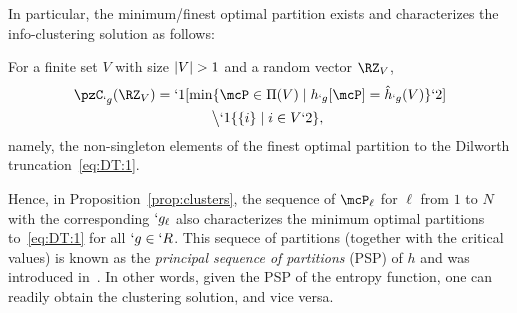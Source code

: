 In particular, the minimum/finest optimal partition exists and characterizes the info-clustering solution as follows:
\begin{Proposition}%
	\label{prop:psp}
	For a finite set $V$ with size $\lvert V\rvert>1$ and a random vector $\RZ_V$,
	\begin{align}
		\begin{split}
	\pzC_{`g}(\RZ_V)
	&=`1[\min \Set{\mcP\in \Pi(V) \mid h_{`g}[\mcP]=\hat{h}_{`g}(V)}`2]\\ &\kern4em \big\backslash`1\{\Set{i}\mid i\in V`2\}, 
	   \end{split}
	\end{align}
namely, the non-singleton elements of the finest optimal partition to the Dilworth truncation~\eqref{eq:DT:1}.
\end{Proposition}

Hence, in Proposition~\ref{prop:clusters}, the sequence of $\mcP_{\ell}$ for $\ell$ from $1$ to $N$
with the corresponding $`g_\ell$ also characterizes the minimum optimal partitions
to~\eqref{eq:DT:1} for all $`g\in `R$. This sequece of partitions (together with the critical values) is known as the \emph{principal sequence of partitions} (PSP) of
$h$ and was introduced in~\cite{narayanan90}.
In other words,
given the PSP of the entropy function, one can readily obtain the clustering solution, and vice versa.

